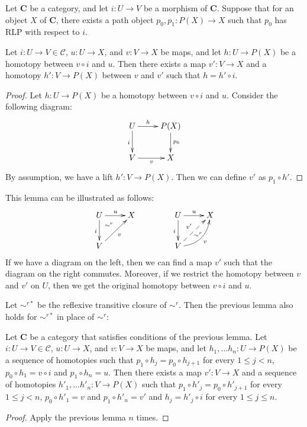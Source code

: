\documentclass{tac}
\theoremstyle{definition}
\newcommand{\cof}{\mathcal{C}}
\newcommand{\cat}[1]{\mathbf{#1}}
\newcommand{\C}{\cat{C}}
\begin{document}
\begin{lem}
Let $\C$ be a category, and let $i : U \to V$ be a morphism of $\C$.
Suppose that for an object $X$ of $\C$, there exists a path object $p_0,p_1 : P(X) \to X$ such that $p_0$ has RLP with respect to $i$.

Let $i : U \to V \in \cof$, $u : U \to X$, and $v : V \to X$ be maps, and let $h : U \to P(X)$ be a homotopy between $v \circ i$ and $u$.
Then there exists a map $v' : V \to X$ and a homotopy $h' : V \to P(X)$ between $v$ and $v'$ such that $h = h' \circ i$.
\end{lem}
\begin{proof}
Let $h : U \to P(X)$ be a homotopy between $v \circ i$ and $u$.
Consider the following diagram:
\[ \xymatrix{ U \ar[r]^-h \ar[d]_i & P(X) \ar[d]^{p_0} \\
              V \ar[r]_v & X
            } \]
By assumption, we have a lift $h' : V \to P(X)$.
Then we can define $v'$ as $p_1 \circ h'$.
\end{proof}

This lemma can be illustrated as follows:
\[ \xymatrix{ U \ar[r]^u \ar[d]_i \ar@{}[dr]|(.3){\sim^r} & X \\
              V \ar[ur]_v &
            }
\qquad \qquad
   \xymatrix{ U \ar[r]^u \ar[d]_i \ar@{}[dr]|(.62){\sim^r} & X \\
              V \ar@{-->}[ur]^{v'} \ar@/_1pc/[ur]_v &
            } \]
If we have a diagram on the left, then we can find a map $v'$ such that the diagram on the right commutes.
Moreover, if we restrict the homotopy between $v$ and $v'$ on $U$, then we get the original homotopy between $v \circ i$  and $u$.

Let $\sim^{r*}$ be the reflexive transitive closure of $\sim^r$.
Then the previous lemma also holds for $\sim^{r*}$ in place of $\sim^r$:

\begin{lem}
Let $\C$ be a category that satisfies conditions of the previous lemma.
Let $i : U \to V \in \cof$, $u : U \to X$, and $v : V \to X$ be maps, and let $h_1, \ldots h_n : U \to P(X)$ be a sequence of homotopies
such that $p_1 \circ h_j = p_0 \circ h_{j+1}$ for every $1 \leq j < n$, $p_0 \circ h_1 = v \circ i$ and $p_1 \circ h_n = u$.
Then there exists a map $v' : V \to X$ and a sequence of homotopies $h'_1, \ldots h'_n : V \to P(X)$
such that $p_1 \circ h'_j = p_0 \circ h'_{j+1}$ for every $1 \leq j < n$, $p_0 \circ h'_1 = v$ and $p_1 \circ h'_n = v'$ and $h_j = h'_j \circ i$ for every $1 \leq j \leq n$.
\end{lem}
\begin{proof}
Apply the previous lemma $n$ times.
\end{proof}
\end{document}
